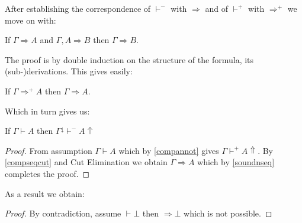 After establishing the correspondence of $\vdash^{-}$ with $\Rightarrow$ and of $\vdash^{+}$ with $\Rightarrow^{+}$ we move on with:
\begin{theorem}
	If $\Gamma\Rightarrow A$ and $\Gamma,A\Rightarrow B$ then $\Gamma\Rightarrow B$.
\end{theorem}
The proof is by double induction on the structure of the formula, its (sub-)derivations. This gives easily:
\begin{theorem}
	If $\Gamma\Rightarrow^{+}A$ then $\Gamma\Rightarrow A$.
	
\end{theorem}
Which in turn gives us:
\begin{theorem}
	\label{normalization}
	If $\Gamma\vdash A$ then $\Gamma^{\downarrow}\vdash^{-} A\Uparrow$
\end{theorem}
\begin{proof}
	From assumption $\Gamma \vdash A$ which by \ref{compannot} gives $\Gamma\vdash^{+} A\Uparrow$. By \ref{compseqcut} and Cut  Elimination we obtain $\Gamma\Rightarrow A$ which by  \ref{soundnseq} completes the proof.
\end{proof}
As a result we obtain:
\begin{proof}
	By contradiction, assume $\vdash\bot$ then $\Rightarrow \bot$ which is not possible.
\end{proof}